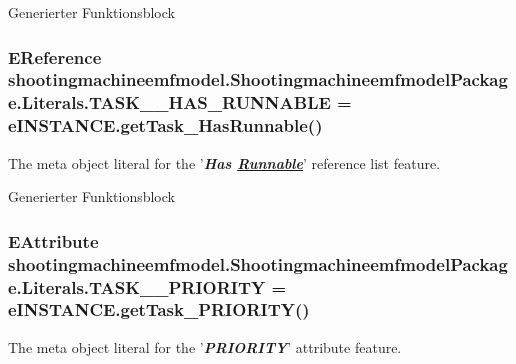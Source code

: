 Generierter Funktionsblock \hypertarget{interfaceshootingmachineemfmodel_1_1_shootingmachineemfmodel_package_1_1_literals_a8179b43f089e2fe704940ce814273d02}{
\subsubsection[{T\-A\-S\-K\-\_\-\-\_\-\-H\-A\-S\-\_\-\-R\-U\-N\-N\-A\-B\-L\-E}]{\setlength{\rightskip}{0pt plus 5cm}E\-Reference shootingmachineemfmodel.\-Shootingmachineemfmodel\-Package.\-Literals.\-T\-A\-S\-K\-\_\-\-\_\-\-H\-A\-S\-\_\-\-R\-U\-N\-N\-A\-B\-L\-E = e\-I\-N\-S\-T\-A\-N\-C\-E.\-get\-Task\-\_\-\-Has\-Runnable()}}\label{interfaceshootingmachineemfmodel_1_1_shootingmachineemfmodel_package_1_1_literals_a8179b43f089e2fe704940ce814273d02}
The meta object literal for the '{\itshape {\bfseries Has \hyperlink{interfaceshootingmachineemfmodel_1_1_runnable}{Runnable}}}' reference list feature.

Generierter Funktionsblock \hypertarget{interfaceshootingmachineemfmodel_1_1_shootingmachineemfmodel_package_1_1_literals_a6860394b9f9e403b44382ad8d19b97b3}{
\subsubsection[{T\-A\-S\-K\-\_\-\-\_\-\-P\-R\-I\-O\-R\-I\-T\-Y}]{\setlength{\rightskip}{0pt plus 5cm}E\-Attribute shootingmachineemfmodel.\-Shootingmachineemfmodel\-Package.\-Literals.\-T\-A\-S\-K\-\_\-\-\_\-\-P\-R\-I\-O\-R\-I\-T\-Y = e\-I\-N\-S\-T\-A\-N\-C\-E.\-get\-Task\-\_\-\-P\-R\-I\-O\-R\-I\-T\-Y()}}\label{interfaceshootingmachineemfmodel_1_1_shootingmachineemfmodel_package_1_1_literals_a6860394b9f9e403b44382ad8d19b97b3}
The meta object literal for the '{\itshape {\bfseries P\-R\-I\-O\-R\-I\-T\-Y}}' attribute feature.

